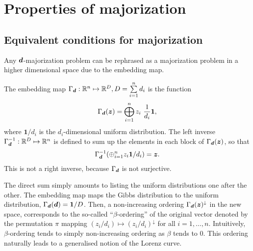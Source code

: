 
\section{Properties of majorization}
\label{app:major}

\subsection{Equivalent conditions for majorization}

Any $\bm{d}$-majorization problem can be rephrased as a majorization problem in a higher dimensional space due to the embedding map.
\begin{definition}
    The embedding map $\Gamma_{\bm{d}}:\mathbb{R}^n \mapsto \mathbb{R}^D, D = \sum\limits_{i=1}^n d_i$ is the function
    \begin{equation}
        \Gamma_{\bm{d}}(\bm{z}) = \bigoplus_{i=1}^n z_i\  \frac{1}{d_i}\bm{1},
    \end{equation}
    where $\bm{1}/d_i$ is the $d_i$-dimensional uniform distribution.
    The left inverse $\Gamma_{\bm{d}}^{-1}: \mathbb{R}^D \mapsto \mathbb{R}^n$ is defined to sum up the elements in each block of $\Gamma_{\bm{d}}(\bm{z})$, so that
    \begin{equation}
        \Gamma_{\bm{d}}^{-1}(\oplus_{i=1}^n z_i \bm{1}/d_i) = \bm{z}.
    \end{equation}
    This is not a right inverse, because $\Gamma_{\bm{d}}$ is not surjective.
\end{definition}
The direct sum simply amounts to listing the uniform distributions one after the other.
The embedding map maps the Gibbs distribution to the uniform distribution, $\Gamma_{\bm{d}}(\bm{d}) = \bm{1}/D$.
Then, a non-increasing ordering $\Gamma_{\bm{d}}(\bm{z})^\downarrow$ in the new space, corresponds to the so-called ``$\beta$-ordering'' of the original vector denoted by the permutation $\pi$ mapping $(z_i/d_i) \mapsto (z_i/d_i)^\downarrow$ for all $i=1,\dots,n$.
Intuitively, $\beta$-ordering tends to simply non-increasing ordering as $\beta$ tends to 0.
This ordering naturally leads to a generalised notion of the Lorenz curve. 

